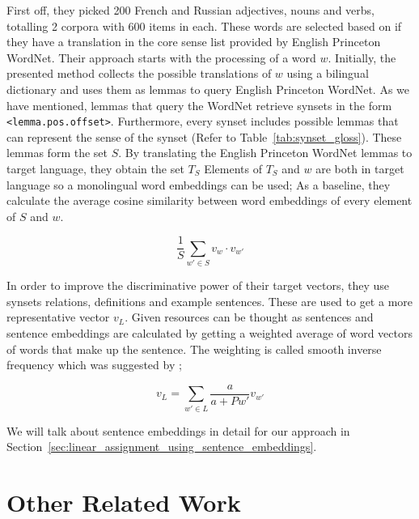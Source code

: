 First off, they picked 200 French and Russian adjectives, nouns and verbs, totalling 2 corpora with 600 items in each.
These words are selected based on if they have a translation in the core sense list provided by English Princeton WordNet.
Their approach starts with the processing of a word $w$.
Initially, the presented method collects the possible translations of $w$ using a bilingual dictionary and uses them as lemmas to query English Princeton WordNet.
As we have mentioned, lemmas that query the WordNet retrieve synsets in the form \texttt{<lemma.pos.offset>}.
Furthermore, every synset includes possible lemmas that can represent the sense of the synset (Refer to Table~\ref{tab:synset_gloss}).
These lemmas form the set $S$.
By translating the English Princeton WordNet lemmas to target language, they obtain the set $T_S$
Elements of $T_S$ and $w$ are both in target language so a monolingual word embeddings can be used;
As a baseline, they calculate the average cosine similarity between word embeddings of every element of $S$ and $w$.

\begin{displaymath}
    \frac{1}{S}\sum_{w' \in S}v_{w} \cdot v_{w'}
\end{displaymath}

In order to improve the discriminative power of their target vectors, they use synsets relations, definitions and example sentences.
These are used to get a more representative vector $v_{L}$.
Given resources can be thought as sentences and sentence embeddings are calculated by getting a weighted average of word vectors of words that make up the sentence.
The weighting is called smooth inverse frequency which was suggested by \textcite{arora_simple_2016};

\begin{displaymath}
    v_{L} = \sum_{w' \in L}\frac{a}{a + P{w'}}v_{w'}
\end{displaymath}

We will talk about sentence embeddings in detail for our approach in Section~\ref{sec:linear_assignment_using_sentence_embeddings}.

\section{Other Related Work}%
\label{sec:other_related_work}

